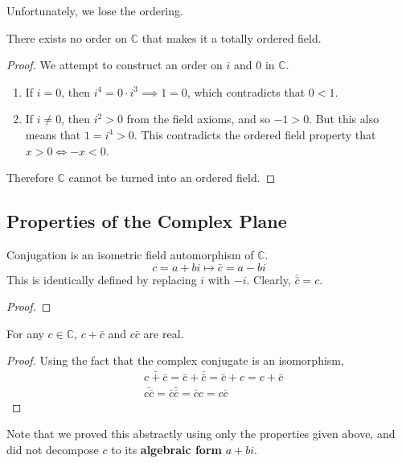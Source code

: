   Unfortunately, we lose the ordering. 

  \begin{theorem}
    There exists no order on $\mathbb{C}$ that makes it a totally ordered field.
  \end{theorem}
  \begin{proof}
    We attempt to construct an order on $i$ and $0$ in $\mathbb{C}$. 
    \begin{enumerate}
      \item If $i = 0$, then $i^4 = 0 \cdot i^3 \implies 1 = 0$, which contradicts that $0 < 1$. 
      \item If $i \neq 0$, then $i^2 > 0$ from the field axioms, and so $-1 > 0$. But this also means that $1 = i^4 > 0$. This contradicts the ordered field property that $x > 0 \iff -x < 0$. 
    \end{enumerate}
    Therefore $\mathbb{C}$ cannot be turned into an ordered field. 
  \end{proof}

\subsection{Properties of the Complex Plane}

  \begin{theorem}
    Conjugation is an isometric field automorphism of $\mathbb{C}$. 
    \begin{equation}
      c = a + b i \mapsto \bar{c} = a - b i
    \end{equation}
    This is identically defined by replacing $i$ with $-i$. Clearly, $\bar{\bar{c}} = c$. 
  \end{theorem}
  \begin{proof}
    
  \end{proof}

  \begin{proposition}
    For any $c \in \mathbb{C}$, $c + \bar{c}$ and $c \bar{c}$ are real. 
  \end{proposition}
  \begin{proof}
    Using the fact that the complex conjugate is an isomorphism, 
    \begin{align*}
      & \bar{c + \bar{c}} = \bar{c} + \bar{\bar{c}} = \bar{c} + c = c + \bar{c} \\
      & \bar{ c \bar{c}} = \bar{c} \bar{\bar{c}} = \bar{c} c = c \bar{c}
    \end{align*}
  \end{proof}
  Note that we proved this abstractly using only the properties given above, and did not decompose $c$ to its \textbf{algebraic form} $a + b i$. 

